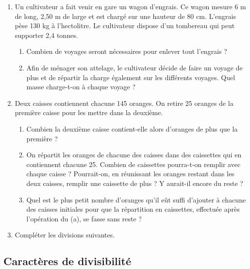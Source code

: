 \documentclass[12 pt]{extarticle}
\theoremstyle{plain}
\begin{document}
\begin{enumerate}
\begin{enumerate}
 \end{enumerate}
 \item Un cultivateur a fait venir en gare un wagon 
 d'engrais. Ce wagon mesure 6 m de long, 2,50 m de large et est chargé sur une hauteur de 80 cm. 
 L'engrais pèse 130 kg à l'hectolitre. Le cultivateur dispose d'un tombereau qui peut supporter 2,4 tonnes. 
 \begin{enumerate}
 \item Combien de voyages seront nécessaires pour enlever
 tout l'engrais ?
 \item  Afin de ménager son attelage, le cultivateur décide de faire un voyage de plus et de répartir la charge également sur les différents voyages. Quel masse charge-t-on à chaque voyage ? 
 \end{enumerate}
 \item Deux caisses contiennent chacune 145 oranges. On retire 25 oranges de la première caisse pour les mettre dans la deuxième. 
 \begin{enumerate}
 \item Combien la deuxième caisse contient-elle alors d'oranges de plus que la première ? 
 \item On répartit les oranges de chacune des caisses 
 dans des caissettes qui en contiennent chacune 25. 
 Combien de caissettes pourra-t-on remplir avec chaque
 caisse ? Pourrait-on, en réunissant les oranges restant dans les deux caisses, remplir une caissette
 de plus ? Y aurait-il encore du reste ? 
 \item Quel est le plus petit nombre d'oranges qu'il eût suffi d'ajouter à chacune des caisses initiales pour que la répartition en caissettes, effectuée après l'opération du (a), se fasse sans reste ? 
 \end{enumerate}
 \item Compléter les divisions suivantes. 
 
 \end{enumerate}
 
 \subsection{Caractères de divisibilité}
 
\end{document}

